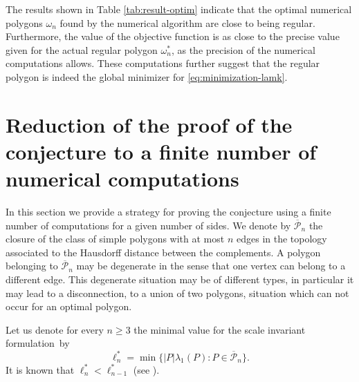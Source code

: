 \documentclass[JEP,XML,SOM,Unicode,ThmDefs,NoFloatCountersInSection,published]{cedram}
\theoremstyle{plain}
\theoremstyle{definition}
\newcommand{\ov}{\overline}
\begin{document}
The results shown in Table \ref{tab:result-optim} indicate that the optimal numerical polygons $\omega_n$ found by the numerical algorithm are close to being regular. Furthermore, the value of the objective function is as close to the precise value given for the actual regular polygon $\omega_n^*$, as the precision of the numerical computations allows. These computations further suggest that the regular polygon is indeed the global minimizer for \eqref{eq:minimization-lamk}.

\section{Reduction of the proof of the conjecture to a finite number of numerical computations}\label{bobu200}

In this section we provide a strategy for proving the conjecture using a finite number of computations for a given number of sides. We denote by $ \ov { \mathcal P}_n $ the closure of the class of simple polygons with at most $n$ edges in the topology associated to the Hausdorff distance between the complements. A polygon belonging to $ \ov { \mathcal P}_n $ may be degenerate in the sense that one vertex can belong to a different edge. This degenerate situation may be of different types, in particular it may lead to a disconnection, \ie to a union of two polygons, situation which can not occur for an optimal polygon.

Let us denote for every $n \ge 3$ the minimal value for the scale invariant formulation~by
\[
\ell_n^*= \min \{|P|\lambda_1(P) : P \in \ov { \mathcal P}_n \}.
\]
It is known that $\ell_n^* < \ell_{n-1}^*$ (see \cite[\S 3.3]{henroteigs}).
\end{document}
